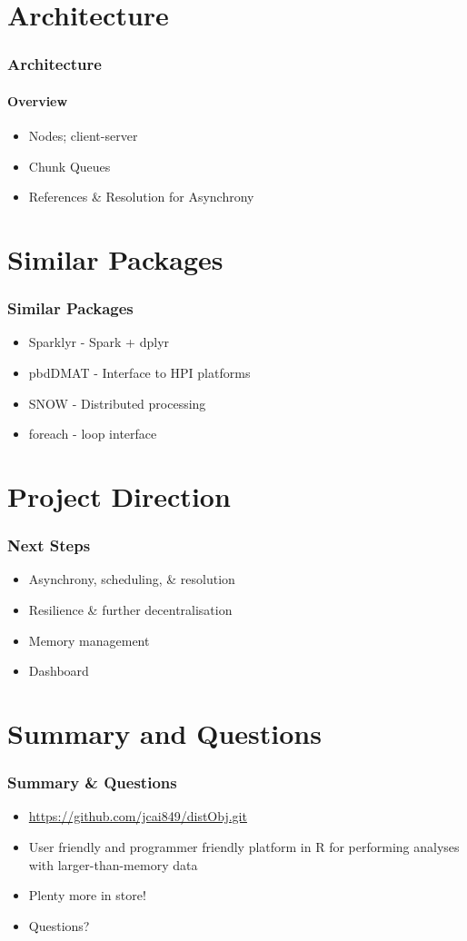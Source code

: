 \documentclass[handout]{beamer}
\begin{document}
\section{Architecture}
	\begin{frame}
		\frametitle{Architecture}
		\framesubtitle{Overview}
		\begin{itemize}
			\item Nodes; client-server
			\item Chunk Queues
			\item References \& Resolution for Asynchrony
		\end{itemize}
	\end{frame}
\section{Similar Packages}
	\begin{frame}
		\frametitle{Similar Packages}
		\begin{itemize}
			\item Sparklyr - Spark + dplyr
			\item pbdDMAT - Interface to HPI platforms
			\item SNOW - Distributed processing
			\item foreach - loop interface
		\end{itemize}
	\end{frame}
\section{Project Direction}
	\begin{frame}
		\frametitle{Next Steps}
		\begin{itemize}
			\item Asynchrony, scheduling, \& resolution
			\item Resilience \& further decentralisation
			\item Memory management
			\item Dashboard
		\end{itemize}
	\end{frame}
\section{Summary and Questions}
	\begin{frame}
		\frametitle{Summary \& Questions}
		\begin{itemize}
			\item \url{https://github.com/jcai849/distObj.git}
			\item User friendly and programmer friendly platform in R for performing analyses with larger-than-memory data
			\item Plenty more in store!
			\item Questions?
		\end{itemize}
	\end{frame}
\end{document}

